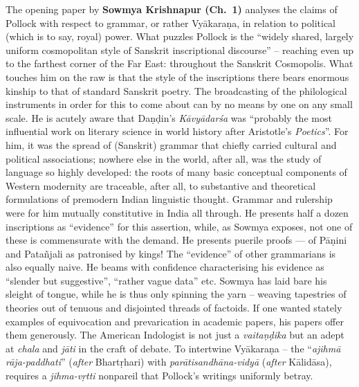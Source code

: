 The opening paper by {\bf Sowmya Krishnapur (Ch.~1)} analyses the claims of Pollock with respect to grammar, or rather Vyākaraṇa, in relation to political (which is to say, royal) power. What puzzles Pollock is the “widely shared, largely uniform cosmopolitan style of Sanskrit inscriptional discourse” -- reaching even up to the farthest corner of the Far East: throughout the Sanskrit Cosmopolis. What touches him on the raw is that the style of the inscriptions there bears enormous kinship to that of standard Sanskrit poetry. The broadcasting of the philological instruments in order for this to come about can by no means by one on any small scale. He is acutely aware that Daṇḍin’s {\sl Kāvyādarśa} was “probably the most influential work on literary science in world history after Aristotle’s {\sl Poetics}”. For him, it was the spread of (Sanskrit) grammar that chiefly carried cultural and political associations; nowhere else in the world, after all, was the study of language so highly developed: the roots of many basic conceptual components of Western modernity are traceable, after all, to substantive and theoretical formulations of premodern Indian linguistic thought. Grammar and rulership were for him mutually constitutive in India all through. He presents half a dozen inscriptions as “evidence” for this assertion, while, as Sowmya exposes, not one of these is commensurate with the demand. He presents puerile proofs --- of Pāṇini and Patañjali as patronised by kings! The “evidence” of other grammarians is also equally naive. He beams with confidence characterising his evidence as “slender but suggestive”, “rather vague data” etc. Sowmya has laid bare his sleight of tongue, while he is thus only spinning the yarn – weaving tapestries of theories out of tenuous and disjointed threads of factoids. If one wanted stately examples of equivocation and prevarication in academic papers, his papers offer them generously. The American Indologist is not just a {\sl vaitaṇḍika} but an adept at {\sl chala} and {\sl jāti} in the craft of debate. To intertwine Vyākaraṇa -- the “{\sl ajihmā rāja-paddhati}” ({\sl after} Bhartṛhari) with {\sl parātisandhāna-vidyā} ({\sl after} Kālidāsa), requires a {\sl jihma-vṛtti} nonpareil that Pollock’s writings uniformly betray.
\vskip 8pt

